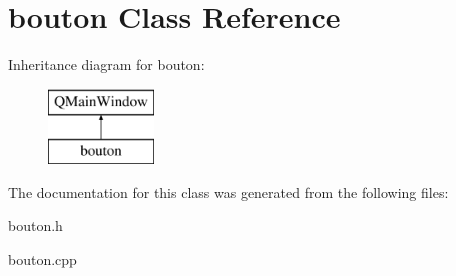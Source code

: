 \hypertarget{classbouton}{}\section{bouton Class Reference}
\label{classbouton}
Inheritance diagram for bouton\+:\begin{figure}[H]
\begin{center}
\leavevmode
\includegraphics[height=2.000000cm]{classbouton}
\end{center}
\end{figure}


The documentation for this class was generated from the following files\+:\begin{DoxyCompactItemize}
\item 
bouton.\+h\item 
bouton.\+cpp\end{DoxyCompactItemize}
